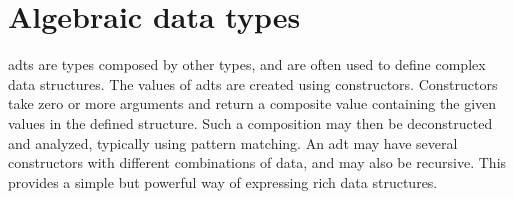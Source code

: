 \section{Algebraic data types}

\Glspl{adt} are types composed by other types, and are often used to define complex data structures. The values of \glspl{adt} are created using constructors. Constructors take zero or more arguments and return a composite value containing the given values in the defined structure. Such a composition may then be deconstructed and analyzed, typically using pattern matching. An \gls{adt} may have several constructors with different combinations of data, and may also be recursive. This provides a simple but powerful way of expressing rich data structures.

